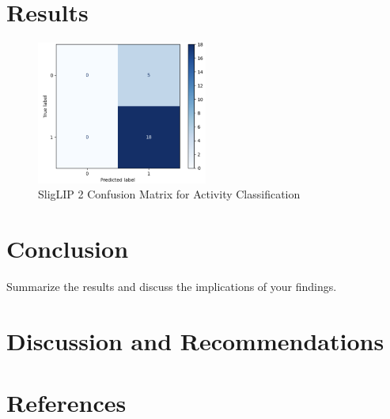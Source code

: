 \documentclass[a4paper,12pt]{article}
\begin{document}
\section{Results}
\begin{figure}[H]
    \centering
    \includegraphics[width=0.5\textwidth]{./images/test confusion matrix.png} %
    \caption{SligLIP 2 Confusion Matrix for Activity Classification}
    \label{fig:test-cm}
\end{figure}




\section{Conclusion}
Summarize the results and discuss the implications of your findings.

\section{Discussion and Recommendations}

\section*{References}
\end{document}
